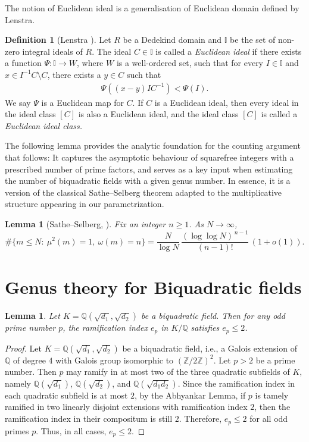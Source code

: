 \documentclass[12 pt]{amsart}
\newcommand\I{{\mathbb{I}}}
\newcommand{\Q}{\mathbb{Q}}
\newtheorem{lemma}[thm]{Lemma}
\theoremstyle{definition}
\newtheorem{definition}{Definition}
\theoremstyle{remark}
\begin{document}
The notion of Euclidean ideal is a generalisation of Euclidean domain defined by Lenstra\cite{Len79}.  \begin{definition} [Lenstra \cite{Len79}] \label{EI}	Let $R$ be a Dedekind domain and $\I$ be the set of non-zero integral ideals of $R$. The ideal  $C \in \I$   is called a  {\it Euclidean ideal} if there exists a function $\Psi:\I \to W$, where $W$ is  a well-ordered set, such that for every $I \in \I $ and  $x\in I^{-1}C \setminus C$,  there exists a  $y\in C$ such that 
		\begin{align*}
			\Psi\left( (x-y)IC^{-1} \right) < \Psi (I).
		\end{align*}
		We say  $\Psi$ is a Euclidean map for $C$.
		If $C$ is a Euclidean ideal, then every ideal in the ideal class $[C]$ is also a Euclidean ideal, and the ideal class $[C]$ is called  a {\it Euclidean ideal class.}
	\end{definition}

\noindent
The following  lemma provides the analytic foundation for the counting argument that follows:
It captures the asymptotic behaviour of squarefree integers with a prescribed number
of prime factors, and serves as a key input when estimating the number of biquadratic
fields with a given genus number. In essence, it is a version of the classical
Sathe--Selberg theorem adapted to the multiplicative structure appearing in our
parametrization.

    \begin{lemma}[Sathe--Selberg, \cite{Ten15book}]\label{lem:ss}
	Fix an integer $n\ge 1$. As $N\to\infty$,
	\[
	\#\{m\le N:\ \mu^2(m)=1,\ \omega(m)=n\}
	= \frac{N}{\log N}\,\frac{(\log\log N)^{\,n-1}}{(n-1)!}\,(1+o(1)).
	\]
\end{lemma}



    	\section{Genus theory for Biquadratic fields}\label{sec:genus}
	\begin{lemma}\label{ramification}
		Let $K=\Q(\sqrt{d_1}, \sqrt{d_2})$ be a biquadratic field. Then for any odd prime number $p$, the ramification index $e_p$ in $K/\mathbb{Q}$ satisfies $e_p \leq 2$.
	\end{lemma}
	
	\begin{proof}
		Let $K = \mathbb{Q}(\sqrt{d_1}, \sqrt{d_2})$ be a biquadratic field, i.e., a Galois extension of $\mathbb{Q}$ of degree $4$ with Galois group isomorphic to $(\mathbb{Z}/2\mathbb{Z})^2$. Let $p > 2$ be a prime number. Then $p$ may ramify in at most two of the three quadratic subfields of $K$, namely $\mathbb{Q}(\sqrt{d_1})$, $\mathbb{Q}(\sqrt{d_2})$, and $\mathbb{Q}(\sqrt{d_1d_2})$.
		Since the ramification index in each quadratic subfield is at most $2$, by the Abhyankar Lemma, if $p$ is tamely ramified in two linearly disjoint extensions with ramification index $2$, then the ramification index in their compositum is still $2$. Therefore, $e_p \leq 2$ for all odd primes $p$. Thus, in all cases, $e_p \leq 2$.
	\end{proof}
\end{document}
